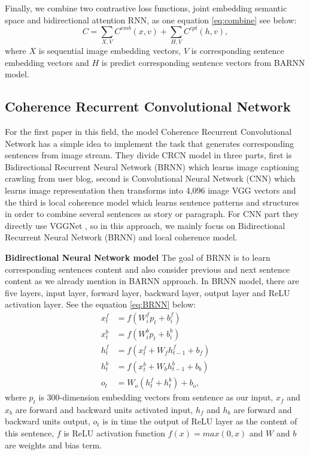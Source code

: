 \documentclass[11pt]{article}
\begin{document}
Finally, we combine two contrastive loss functions, joint embedding semantic space and bidirectional attention RNN, as one equation \ref{eq:combine} see below:
\begin{equation}
C = \sum_{X,V} C^{emb}(x,v) + \sum_{H,V}C^{cpt}(h,v),
\label{eq:combine}
\end{equation}
where $X$ is sequential image embedding vectors, $V$ is corresponding sentence embedding vectors and $H$ is predict corresponding sentence vectors from BARNN model.


\subsection{Coherence Recurrent Convolutional Network}

For the first paper in this field, the model Coherence Recurrent Convolutional Network has a simple idea to implement the task that generates corresponding sentences from image stream. They divide CRCN model in three parts, first is Bidirectional Recurrent Neural Network (BRNN) which learns image captioning crawling from user blog, second is Convolutional Neural Network (CNN) which learns image representation then transforms into 4,096 image VGG vectors and the third is local coherence model \cite{Barzilay:2008:MLC:1350986.1350987} which learns sentence patterns and structures in order to combine several sentences as story or paragraph. For CNN part they directly use VGGNet \cite{Simonyan14c}, so in this approach, we mainly focus on Bidirectional Recurrent Neural Network (BRNN) and local coherence model.

{\bf Bidirectional Neural Network model} The goal of BRNN is to learn corresponding sentences content and also consider previous and next sentence content as we already mention in BARNN approach. In BRNN model, there are five layers, input layer, forward layer, backward layer, output layer and ReLU activation layer. See the equation \ref{eq:BRNN} below:
\begin{equation}
\begin{aligned}
x_{t}^{f} &= f(W_{i}^{f}p_{t}+b_{i}^{f}) \\
x_{t}^{b} &= f(W_{i}^{b}p_{t}+b_{i}^{b}) \\
h_{t}^{f} &= f(x_{t}^{f} + W_{f}h_{t-1}^{f}+b_{f}) \\
h_{t}^{b} &= f(x_{t}^{b} + W_{b}h_{t-1}^{b}+b_{b}) \\
o_{t} &= W_{o}(h_{t}^{f} + h_{t}^{b}) + b_{o}, 
\end{aligned}
\label{eq:BRNN}
\end{equation} 
where $p_t$ is 300-dimension embedding vectors from sentence as our input, $x_f$ and $x_b$ are forward and backward units activated input, $h_f$ and $h_b$ are forward and backward units output, $o_t$ is in time the output of ReLU layer as the content of this sentence, $f$ is ReLU activation function $f(x) = max(0,x)$ and $W$ and $b$ are weights and bias term. 
\end{document}
